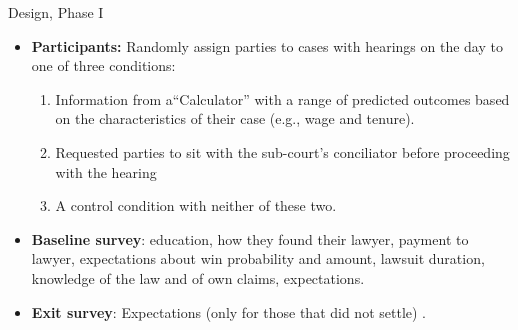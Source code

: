 \documentclass[9pt]{beamer}
\begin{document}
\begin{frame}{Design, Phase I}{}
   \begin{itemize}
   
        \item \textbf{Participants:} Randomly assign parties to cases with hearings on the day to one of three conditions:
        
        \begin{enumerate}
            \item Information from a``Calculator'' with a range of predicted outcomes based on the characteristics of their case (e.g., wage and tenure). 
            \item Requested parties to sit with the sub-court's conciliator before proceeding with the hearing
            \item A control condition with neither of these two.
        \end{enumerate}
   
                \vspace{0.05in}
    \item \textbf{Baseline survey}: education, how they found their lawyer, payment to lawyer, expectations about win probability and amount, lawsuit duration, knowledge of the law and of own claims, expectations.
                \vspace{0.05in}
    \item \textbf{Exit survey}: Expectations (only for those that did not settle) .
   \end{itemize}
\end{frame}
\end{document}
